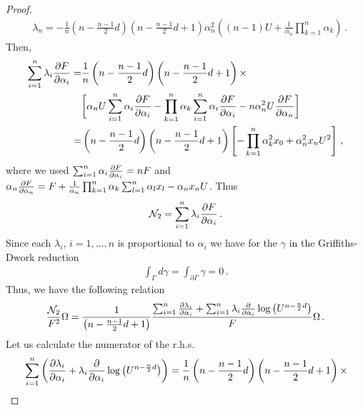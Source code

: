 \documentclass[10pt,a4paper]{amsart}
\begin{document}
\begin{proof}
\begin{align}
&\lambda_{n} = -\frac{1}{n}\left(  n - \frac{n-1}{2}d \right) \left(  n - \frac{n-1}{2}d +1 \right) \alpha_{n}^{2}  \left( (n-1) U + \frac{1}{\alpha_{n}}\prod_{k=1}^{n} \alpha_{k} \right) \,.
\end{align}
Then,
\begin{align}
\begin{split}
\sum_{i=1}^{n} \lambda_{i} \frac{\partial {\rm F}}{\partial \alpha_{i}} =& \frac{1}{n}\left(  n - \frac{n-1}{2}d \right) \left(  n - \frac{n-1}{2}d +1 \right)\times \\  
&\bigg[
\alpha_{n} U \sum_{i=1}^{n}\alpha_{i} \frac{\partial {\rm F}}{\partial \alpha_{i}} - \prod_{k=1}^{n} \alpha_{k} \sum_{i=1}^{n}\alpha_{i} \frac{\partial {\rm F}}{\partial \alpha_{i}} - n \alpha_{n}^{2} U \frac{\partial {\rm F}}{\partial \alpha_{n}}
\bigg]  \\
=&\left(  n - \frac{n-1}{2}d \right) \left(  n - \frac{n-1}{2}d +1 \right) \left[  
-\prod_{k=1}^{n}\alpha_{k}^{2} x_{0} +\alpha_{n}^{2} x_{n} U^{2}
\right] \,,
\end{split}
\end{align}
where we used $\sum_{i=1}^{n}\alpha_{i} \frac{\partial {\rm F}}{\partial \alpha_{i}} = n {\rm F}$ and $\alpha_{n} \frac{\partial {\rm F}}{\partial \alpha_{n}} = {\rm F} +\frac{1}{\alpha_{n}}\prod_{k=1}^{n}\alpha_{k}\sum_{l=1}^{n}\alpha_{l}x_{l} -\alpha_{n}x_{n} {\rm U}$. Thus
\begin{align}
\mathcal{N}_{2} =  \sum_{i=1}^{n} \lambda_{i} \frac{\partial {\rm F}}{\partial \alpha_{i}} \,.   
\end{align}
Since each $\lambda_{i}$, $i=1, \hdots , n$ is proportional to $\alpha_{i}$ we have for the $\gamma$ in the Griffiths-Dwork reduction
\begin{align}
\int_{\Gamma} d \gamma = \int_{\partial \Gamma} \gamma = 0 \,.    
\end{align}
Thus, we have the following relation
\begin{align}
\frac{\mathcal{N}_{2}}{{\rm F}^{2}} \Omega = \frac{1}{\left( n -\frac{n-1}{2}d +1 \right)} \frac{\sum_{i=1}^{n}\frac{\partial \lambda_{i}}{\partial \alpha_{i}} + \sum_{i=1}^{n} \lambda_{i} \frac{\partial}{\partial \alpha_{i}} \log\left( {\rm U}^{n - \frac{n}{2}d}\right)}{{\rm F}}\Omega \,.   
\end{align}
Let us calculate the numerator of the r.h.s.
\begin{align}
\begin{split}
&\sum_{i=1}^{n} \left( \frac{\partial \lambda_{i}}{\partial \alpha_{i}} + \lambda_{i} \frac{\partial}{\partial \alpha_{i}} \log\left( {\rm U}^{n - \frac{n}{2}d}\right) \right) = \frac{1}{n}\left( n -\frac{n-1}{2}d \right) \left( n -\frac{n-1}{2}d +1 \right) \times \\

\end{split}
\end{align}
\end{proof}
\end{document}
